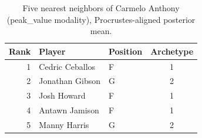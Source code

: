 \begin{table}[htbp]
  \centering\small
  \begin{tabular}{rllc}
    \toprule
    Rank & Player & Position & Archetype \\
    \midrule
    1 & Cedric Ceballos & F & 1 \\
    2 & Jonathan Gibson & G & 2 \\
    3 & Josh Howard & F & 1 \\
    4 & Antawn Jamison & F & 1 \\
    5 & Manny Harris & G & 2 \\
    \bottomrule
  \end{tabular}
  \caption{Five nearest neighbors of Carmelo Anthony (peak_value modality), Procrustes-aligned posterior mean.}
  \label{tab:Carmelo_Anthony_neighbors_peak_value}
\end{table}

